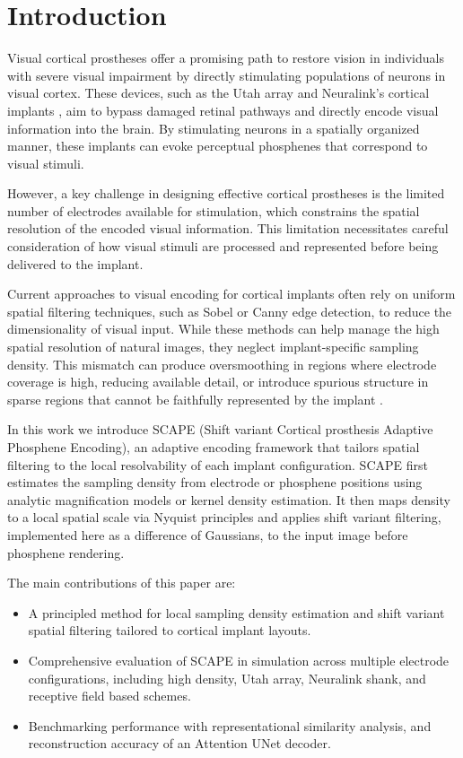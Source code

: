 \section{Introduction}
Visual cortical prostheses offer a promising path to restore vision in individuals with severe visual impairment by directly stimulating populations of neurons in visual cortex. These devices, such as the Utah array \cite{Maynard1997, Normann1999,Schmidt1996} and Neuralink's cortical implants \cite{Musk2019,Zhao2023}, aim to bypass damaged retinal pathways and directly encode visual information into the brain. By stimulating neurons in a spatially organized manner, these implants can evoke perceptual phosphenes that correspond to visual stimuli.

However, a key challenge in designing effective cortical prostheses is the limited number of electrodes available for stimulation, which constrains the spatial resolution of the encoded visual information. This limitation necessitates careful consideration of how visual stimuli are processed and represented before being delivered to the implant.

Current approaches to visual encoding for cortical implants often rely on uniform spatial filtering techniques, such as Sobel or Canny edge detection, to reduce the dimensionality of visual input. While these methods can help manage the high spatial resolution of natural images, they neglect implant-specific sampling density. This mismatch can produce oversmoothing in regions where electrode coverage is high, reducing available detail, or introduce spurious structure in sparse regions that cannot be faithfully represented by the implant \cite{Kasowski2022,Han2021,Relic2022}.

In this work we introduce SCAPE (Shift variant Cortical prosthesis Adaptive Phosphene Encoding), an adaptive encoding framework that tailors spatial filtering to the local resolvability of each implant configuration. SCAPE first estimates the sampling density from electrode or phosphene positions using analytic magnification models or kernel density estimation. It then maps density to a local spatial scale via Nyquist principles and applies shift variant filtering, implemented here as a difference of Gaussians, to the input image before phosphene rendering.

The main contributions of this paper are:
\begin{itemize}
  \item A principled method for local sampling density estimation and shift variant spatial filtering tailored to cortical implant layouts.
  \item Comprehensive evaluation of SCAPE in simulation across multiple electrode configurations, including high density, Utah array, Neuralink shank, and receptive field based schemes.
  \item Benchmarking performance with representational similarity analysis, and reconstruction accuracy of an Attention UNet decoder.
\end{itemize}
